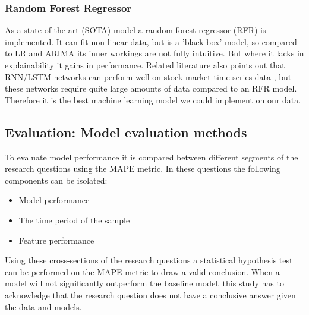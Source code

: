 \subsubsection{Random Forest Regressor}

As a state-of-the-art (SOTA) model a random forest regressor (RFR) is implemented. It can fit non-linear data, but is a 'black-box' model, so compared to LR and ARIMA its inner workings are not fully intuitive. But where it lacks in explainability it gains in performance. Related literature also points out that RNN/LSTM networks can perform well on stock market time-series data \cite{YU20082623}, but these networks require quite large amounts of data compared to an RFR model. Therefore it is the best machine learning model we could implement on our data.

\subsection{Evaluation: Model evaluation methods}
\label{sec:eval}

To evaluate model performance it is compared between different segments of the research questions using the MAPE metric. In these questions the following components can be isolated:

\begin{itemize}
    \item Model performance
    \item The time period of the sample
    \item Feature performance
\end{itemize}

Using these cross-sections of the research questions a statistical hypothesis test can be performed on the MAPE metric to draw a valid conclusion. When a model will not significantly outperform the baseline model, this study has to acknowledge that the research question does not have a conclusive answer given the data and models.